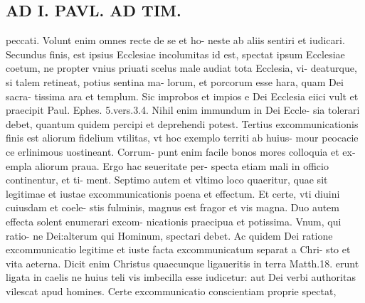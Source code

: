 \documentclass{article}
\begin{document}
\begin{pages}
\section*{AD I. PAVL. AD TIM. }
\marginpar{[ p.403 ]}\pstart peccati. Volunt enim omnes recte de se et ho- neste ab aliis sentiri et iudicari.  \pend\pstart Secundus finis, est ipsius Ecclesiae incolumitas id est, spectat ipsum Ecclesiae coetum, ne propter vnius priuati scelus male audiat tota Ecclesia, vi- deaturque, si talem retineat, potius sentina ma- lorum, et porcorum esse hara, quam Dei sacra- tissima ara et templum. Sic improbos et impios e Dei Ecclesia eiici vult et praecipit Paul. Ephes. 5.vers.3.4. Nihil enim immundum in Dei Eccle- sia tolerari debet, quantum quidem percipi et deprehendi potest.  \pend\pstart Tertius excommunicationis finis est aliorum fidelium vtilitas, vt hoc exemplo territi ab huius- mour peocacie ce erlinimous uostineant. Corrum- punt enim facile bonos mores colloquia et ex- empla aliorum praua. Ergo hac seueritate per- specta etiam mali in officio continentur, et ti- ment.  \pend\pstart Septimo autem et vltimo loco quaeritur, quae sit legitimae et iustae excommunicationis poena et effectum. Et certe, vti diuini cuiusdam et coele- stis fulminis, magnus est fragor et vis magna. Duo autem effecta solent enumerari excom- nicationis praecipua et potissima. Vnum, qui ratio- ne Dei:alterum qui Hominum, spectari debet. Ac quidem Dei ratione excommunicatio legitime et iuste facta excommunicatum separat a Chri- sto et vita aeterna. Dicit enim Christus quaecunque  ligaueritis in terra Matth.18. erunt ligata in caelis ne huius teli vis imbecilla esse iudicetur: aut Dei verbi authoritas vilescat apud homines. Certe excommunicatio conscientiam proprie spectat,  \pend

\end{pages}
\end{document}

